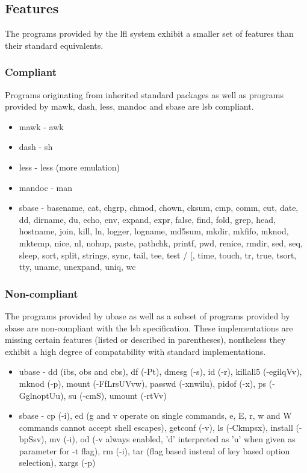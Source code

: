 \subsection{Features}\label{Features}

The programs provided by the \gls{lfl} system exhibit a smaller set of features than their standard equivalents.

\subsubsection{Compliant}

Programs originating from inherited standard packages as well as programs provided by mawk, dash, less, mandoc and sbase are \gls{lsb} compliant.

\begin{itemize}
    \item mawk - awk
    \item dash - sh
    \item less - less (more emulation)
    \item mandoc - man
    \item sbase - basename, cat, chgrp, chmod, chown, cksum, cmp, comm, cut, date, dd, dirname, du, echo, env, expand, expr, false, find, fold, grep, head, hostname, join, kill, ln, logger, logname, md5sum, mkdir, mkfifo, mknod, mktemp, nice, nl, nohup, paste, pathchk, printf, pwd, renice, rmdir, sed, seq, sleep, sort, split, strings, sync, tail, tee, test / [, time, touch, tr, true, tsort, tty, uname, unexpand, uniq, wc
\end{itemize}

\subsubsection{Non-compliant}

The programs provided by ubase as well as a subset of programs provided by sbase are non-compliant with the \gls{lsb} specification. These implementations are missing certain features (listed or described in parentheses), nontheless they exhibit a high degree of compatability with standard implementations.

\begin{itemize}
    \item ubase - dd (ibs, obs and cbs), df (-Pt), dmesg (-s), id (-r), killall5 (-egilqVv), mknod (-p), mount (-FfLrsUVvw), passwd (-xnwilu), pidof (-x), ps (-GglnoptUu), su (-cmS), umount (-rtVv)
    \item sbase - cp (-i), ed (g and v operate on single commands, e, E, r, w and W commands cannot accept shell escapes), getconf (-v), ls (-Ckmpsx), install (-bpSsv), mv (-i), od (-v always enabled, 'd' interpreted as 'u' when given as parameter for -t flag), rm (-i), tar (flag based instead of key based option selection), xargs (-p)
\end{itemize}
